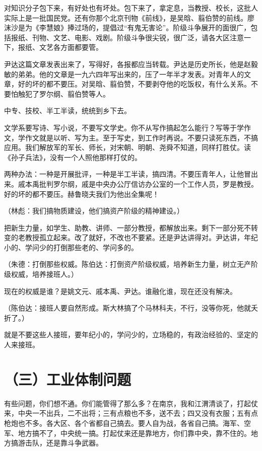 对知识分子包下来，有好处也有坏处。包下来了，拿定息，当教授、校长，这批人实际上是一批国民党。还有你那个北京刊物《前线》，是吴晗、翦伯赞的前线。廖沫沙是为《李慧娘》捧过场的，提倡过“有鬼无害论”。阶级斗争展开的面很广，包括报纸、刊物、文艺、电影、戏剧。阶级斗争很尖锐，很广泛，请各大区注意一下，报纸、文艺各方面都要管。

尹达这篇文章发表出来了，写得好，各报都应当转载。尹达是历史所长，他是赵毅敏的弟弟。他的文章是一九六四年写出来的，压了一年半才发表。对青年人的文章，好的坏的都不要压。对吴晗、翦伯赞，不要剥夺他的吃饭权，有什么关系。不要怕触犯了罗尔纲、翦伯赞等人。

中专、技校、半工半读，统统到乡下去。

文学系要写诗、写小说，不要写文学史。你不从写作搞起怎么能行？写等于学作文，学作文就是以听、写为主。至于写史，到工作时再说。不要只读死东西，不搞应用。我们解放军的军长、师长，对宋朝、明朝、尧舜不知道，同样打胜仗。读《孙子兵法》，没有一个人照他那样打仗的。

两种办法：一种是开展批评，一种是半工半读，搞四清。不要压青年人，让他冒出来。戚本禹批判罗尔纲，戚是中央办公厅信访办公室的一个工作人员，罗是教授。好的坏的都不要压。赫鲁晓夫我们为他出全集呢！

（林彪：我们搞物质建设，他们搞资产阶级的精神建设。）

把新生力量，如学生、助教、讲师、一部分教授，都解放出来。剩下一部分死不转变的老教授孤立起来。改了就好，不改也不要紧。还是尹达讲得对。尹达讲，年纪小的、学问少的打倒那些老的、学问多的。

（朱德：打倒那些权威。陈伯达：打倒资产阶级权威，培养新生力量，树立无产阶级权威，培养接班人。）

现在的权威是谁？是姚文元、戚本禹、尹达。谁融化谁，现在还没有解决。

（陈伯达：接班人要自然形成。斯大林搞了个马林科夫，不行，没等你死，他就夭折了。）

就是不要这些人接班，要年纪小的，学问少的，立场稳的，有政治经验的、坚定的人来接班。

\section{（三）工业体制问题}

有些问题，你们想不通。你们能管得了那么多？在南京，我和江渭清谈了，打起仗来，中央一不出兵，二不出将；三有点粮也不多，送不去；四又没有衣服；五有点枪炮也不多。各大区、各个省都自己搞去。要人自为战，各省自己搞。海军、空军、地方搞不了，中央统一搞。打起仗来还是靠地方，你们靠中央，靠不住的。地方搞游击队，还是靠斗争武器。

